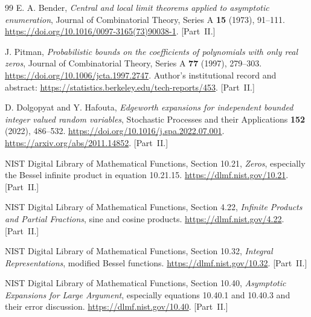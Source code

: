 \documentclass[11pt,letterpaper]{article}
\theoremstyle{remark}\newtheorem{remark}[theorem]{Remark}
\begin{document}
\begin{thebibliography}{99}
E. A. Bender,
\emph{Central and local limit theorems applied to asymptotic enumeration},
Journal of Combinatorial Theory, Series A \textbf{15} (1973), 91--111.
\url{https://doi.org/10.1016/0097-3165(73)90038-1}.
[Part~II.]

J. Pitman,
\emph{Probabilistic bounds on the coefficients of polynomials with only
real zeros}, Journal of Combinatorial Theory, Series A \textbf{77}
(1997), 279--303.
\url{https://doi.org/10.1006/jcta.1997.2747}.
Author's institutional record and abstract:
\url{https://statistics.berkeley.edu/tech-reports/453}.
[Part~II.]

D. Dolgopyat and Y. Hafouta,
\emph{Edgeworth expansions for independent bounded integer valued random
variables}, Stochastic Processes and their Applications \textbf{152}
(2022), 486--532.
\url{https://doi.org/10.1016/j.spa.2022.07.001}.
\url{https://arxiv.org/abs/2011.14852}.
[Part~II.]

NIST Digital Library of Mathematical Functions, Section 10.21,
\emph{Zeros}, especially the Bessel infinite product in equation 10.21.15.
\url{https://dlmf.nist.gov/10.21}.
[Part~II.]

NIST Digital Library of Mathematical Functions, Section 4.22,
\emph{Infinite Products and Partial Fractions}, sine and cosine products.
\url{https://dlmf.nist.gov/4.22}.
[Part~II.]

NIST Digital Library of Mathematical Functions, Section 10.32,
\emph{Integral Representations}, modified Bessel functions.
\url{https://dlmf.nist.gov/10.32}.
[Part~II.]

NIST Digital Library of Mathematical Functions, Section 10.40,
\emph{Asymptotic Expansions for Large Argument}, especially equations
10.40.1 and 10.40.3 and their error discussion.
\url{https://dlmf.nist.gov/10.40}.
[Part~II.]
\end{thebibliography}
\end{document}
